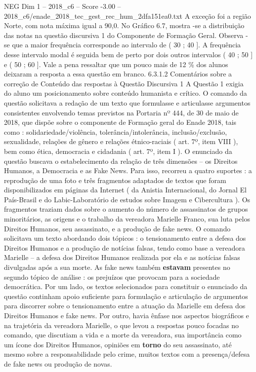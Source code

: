 \begin{textsample}{NEG Dim 1 – 2018\_c6 – Score -3.00 – 2018\_c6/enade\_2018\_tec\_gest\_rec\_hum\_2dfa151ea0.txt}
A exceção foi a região Norte, com nota máxima igual a 90,0.
No Gráfico 6.7, mostra -se a distribuição das notas na questão discursiva 1 do Componente de Formação Geral.
Observa -se que a maior frequência corresponde ao intervalo de ( 30 ; 40 ].
A frequência desse intervalo modal é seguida bem de perto por dois outros intervalos ( 40 ; 50 ] e ( 50 ; 60 ].
Vale a pena ressaltar que um pouco mais de 12 \% dos alunos deixaram a resposta a essa questão em branco. 6.3.1.2 Comentários sobre a correção de Conteúdo das respostas à Questão Discursiva 1 A Questão 1 exigia do aluno um posicionamento sobre conteúdo humanista e crítico.
O comando da questão solicitava a redação de um texto que formulasse e articulasse argumentos consistentes envolvendo temas previstos na Portaria nº 444, de 30 de maio de 2018, que dispõe sobre o componente de Formação geral do Enade 2018, tais como : solidariedade/violência, tolerância/intolerância, inclusão/exclusão, sexualidade, relações de gênero e relações étnico-raciais ( art. 7º, item VIII ), bem como ética, democracia e cidadania ( art. 7º, item I ).
O enunciado da questão buscava o estabelecimento da relação de três dimensões – os Direitos Humanos, a Democracia e as Fake News.
Para isso, recorreu a quatro suportes : a reprodução de uma foto e três fragmentos adaptados de textos que foram disponibilizados em páginas da Internet ( da Anistia Internacional, do Jornal El País-Brasil e do Labic-Laboratório de estudos sobre Imagem e Cibercultura ).
Os fragmentos traziam dados sobre o aumento do número de assassinatos de grupos minoritários, as origens e o trabalho da vereadora Marielle Franco, sua luta pelos Direitos Humanos, seu assassinato, e a produção de fake news.
O comando solicitava um texto abordando dois tópicos : o tensionamento entre a defesa dos Direitos Humanos e a produção de notícias falsas, tendo como base a vereadora Marielle – a defesa dos Direitos Humanos realizada por ela e as notícias falsas divulgadas após a sua morte.
As fake news também \textbf{estavam} presentes no segundo tópico de análise : os prejuízos que provocam para a sociedade democrática.
Por um lado, os textos selecionados para constituir o enunciado da questão continham apoio suficiente para formulação e articulação de argumentos para discorrer sobre o tensionamento entre a atuação da Marielle em defesa dos Direitos Humanos e fake news.
Por outro, havia ênfase nos aspectos biográficos e na trajetória da vereadora Marielle, o que levou a respostas pouco focadas no comando, que discutiam a vida e a morte da vereadora, sua importância como um ícone dos Direitos Humanos, opiniões em \textbf{torno} do seu assassinato, até mesmo sobre a responsabilidade pelo crime, muitos textos com a presença/defesa de fake news ou produção de novas.

\end{textsample}
